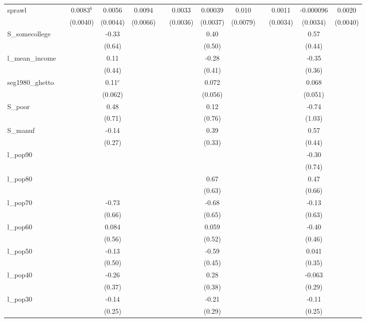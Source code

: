 \documentclass[]{article}
\begin{document}
\begin{tabular}{lcccccccccccc}
sprawl &  & 0.0083$^b$ & 0.0056 & 0.0094 &  & 0.0033 & 0.00039 & 0.010 &  & 0.0011 & -0.000096 & 0.0020 \\
 &  & (0.0040) & (0.0044) & (0.0066) &  & (0.0036) & (0.0037) & (0.0079) &  & (0.0034) & (0.0034) & (0.0040) \\
S\_somecollege &  &  & -0.33 &  &  &  & 0.40 &  &  &  & 0.57 &  \\
 &  &  & (0.64) &  &  &  & (0.50) &  &  &  & (0.44) &  \\
l\_mean\_income &  &  & 0.11 &  &  &  & -0.28 &  &  &  & -0.35 &  \\
 &  &  & (0.44) &  &  &  & (0.41) &  &  &  & (0.36) &  \\
seg1980\_ghetto &  &  & 0.11$^c$ &  &  &  & 0.072 &  &  &  & 0.068 &  \\
 &  &  & (0.062) &  &  &  & (0.056) &  &  &  & (0.051) &  \\
S\_poor &  &  & 0.48 &  &  &  & 0.12 &  &  &  & -0.74 &  \\
 &  &  & (0.71) &  &  &  & (0.76) &  &  &  & (1.03) &  \\
S\_manuf &  &  & -0.14 &  &  &  & 0.39 &  &  &  & 0.57 &  \\
 &  &  & (0.27) &  &  &  & (0.33) &  &  &  & (0.44) &  \\
l\_pop90 &  &  &  &  &  &  &  &  &  &  & -0.30 &  \\
 &  &  &  &  &  &  &  &  &  &  & (0.74) &  \\
l\_pop80 &  &  &  &  &  &  & 0.67 &  &  &  & 0.47 &  \\
 &  &  &  &  &  &  & (0.63) &  &  &  & (0.66) &  \\
l\_pop70 &  &  & -0.73 &  &  &  & -0.68 &  &  &  & -0.13 &  \\
 &  &  & (0.66) &  &  &  & (0.65) &  &  &  & (0.63) &  \\
l\_pop60 &  &  & 0.084 &  &  &  & 0.059 &  &  &  & -0.40 &  \\
 &  &  & (0.56) &  &  &  & (0.52) &  &  &  & (0.46) &  \\
l\_pop50 &  &  & -0.13 &  &  &  & -0.59 &  &  &  & 0.041 &  \\
 &  &  & (0.50) &  &  &  & (0.45) &  &  &  & (0.35) &  \\
l\_pop40 &  &  & -0.26 &  &  &  & 0.28 &  &  &  & -0.063 &  \\
 &  &  & (0.37) &  &  &  & (0.38) &  &  &  & (0.29) &  \\
l\_pop30 &  &  & -0.14 &  &  &  & -0.21 &  &  &  & -0.11 &  \\
 &  &  & (0.25) &  &  &  & (0.29) &  &  &  & (0.25) &  \\

\end{tabular}
\end{document}
